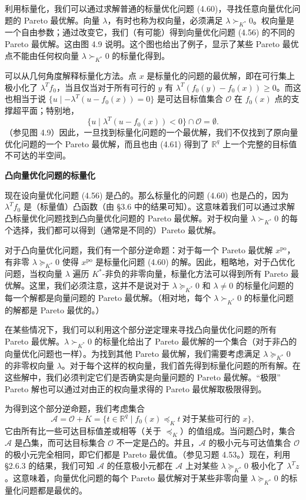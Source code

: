 \documentclass[UTF8, 12pt, fontset=fandol, oneside]{ctexart}
\begin{document}
利用标量化，我们可以通过求解普通的标量优化问题 (4.60)，寻找任意向量优化问题的 Pareto 最优解。向量 $\lambda$，有时也称为权向量，必须满足 $\lambda\succ_{K^\ast}0$。权向量是一个自由参数；通过改变它，我们（有可能）得到向量优化问题 (4.56) 的不同的 Pareto 最优解。这由图 4.9 说明。这个图也给出了例子，显示了某些 Pareto 最优点不能由任何权向量 $\lambda\succ_{K^\ast}0$ 的标量化得到。

可以从几何角度解释标量化方法。点 $x$ 是标量化的问题的最优解，即在可行集上极小化了 $\lambda^Tf_0$，当且仅当对于所有可行的 $y$ 有 $\lambda^T(f_0(y)-f_0(x))\geq 0$。而这也相当于说 $\{u\mid -\lambda^T(u-f_0(x))=0\}$ 是可达目标值集合 $\mathcal{O}$ 在 $f_0(x)$ 点的支撑超平面；特别地，
\begin{equation}
\{u\mid \lambda^T(u-f_0(x))<0\}\cap\mathcal{O}=\emptyset.
\tag{4.61}
\end{equation}
（参见图 4.9）因此，一旦找到标量化问题的一个最优解，我们不仅找到了原向量优化问题的一个 Pareto 最优解，而且也由 (4.61) 得到了 $\mathbb{R}^q$ 上一个完整的目标值不可达的半空间。

\noindent\textbf{凸向量优化问题的标量化}

现在设向量优化问题 (4.56) 是凸的。那么标量化的问题 (4.60) 也是凸的，因为 $\lambda^Tf_0$ 是（标量值）凸函数（由 \S 3.6 中的结果可知）。这意味着我们可以通过求解凸标量优化问题找到凸向量优化问题的 Pareto 最优解。对于权向量 $\lambda\succ_{K^\ast}0$ 的每个选择，我们都可以得到（通常是不同的）Pareto 最优解。

对于凸向量优化问题，我们有一个部分逆命题：对于每一个 Pareto 最优解 $x^{\mathrm{po}}$，有非零 $\lambda\succeq_{K^\ast}0$ 使得 $x^{\mathrm{po}}$ 是标量化问题 (4.60) 的解。因此，粗略地，对于凸优化问题，当权向量 $\lambda$ 遍历 $K^\ast$-非负的非零向量，标量化方法可以得到所有 Pareto 最优解。这里，我们必须注意，这并不是说对于 $\lambda\succeq_{K^\ast}0$ 和 $\lambda\neq 0$ 的标量化问题的每一个解都是向量问题的 Pareto 最优解。（相对地，每个 $\lambda\succ_{K^\ast}0$ 的标量化问题的解都是 Pareto 最优的。）

在某些情况下，我们可以利用这个部分逆定理来寻找凸向量优化问题的所有 Pareto 最优解。$\lambda\succ_{K^\ast}0$ 的标量化给出了 Pareto 最优解的一个集合（对于非凸的向量优化问题也一样）。为找到其他 Pareto 最优解，我们需要考虑满足 $\lambda\succeq_{K^\ast}0$ 的非零权向量 $\lambda$。对于每个这样的权向量，我们首先得到标量化问题的所有解。在这些解中，我们必须判定它们是否确实是向量问题的 Pareto 最优解。“极限” Pareto 解也可以通过对由正的权向量求得的 Pareto 最优解取极限得到。

为得到这个部分逆命题，我们考虑集合
\begin{equation}
\mathcal{A}=\mathcal{O}+K=\{t\in\mathbb{R}^q\mid f_0(x)\preceq_K t\ \text{对于某些可行的 }x\},
\tag{4.62}
\end{equation}
它由所有比一些可达目标值差或相等（关于 $\preceq_K$）的值组成。当问题凸时，集合 $\mathcal{A}$ 是凸集，而可达目标集合 $\mathcal{O}$ 不一定是凸的。并且，$\mathcal{A}$ 的极小元与可达值集合 $\mathcal{O}$ 的极小元完全相同，即它们都是 Pareto 最优值。（参见习题 4.53。）现在，利用 \S 2.6.3 的结果，我们可知 $\mathcal{A}$ 的任意极小元都在 $\mathcal{A}$ 上对某些 $\lambda\succeq_{K^\ast}0$ 极小化了 $\lambda^Tz$。这意味着，向量优化问题的每个 Pareto 最优解对于某些非零向量 $\lambda\succeq_{K^\ast}0$ 的标量化问题都是最优的。
\end{document}

